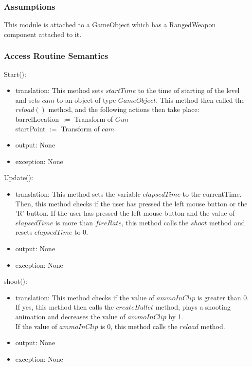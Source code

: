 \documentclass[12pt]{article}
\begin{document}
\subsubsection* {Assumptions}

This module is attached to a GameObject which has a RangedWeapon component attached to it.

\subsubsection* {Access Routine Semantics}

\noindent Start():
\begin{itemize}
	\item translation: This method sets $startTime$ to the time of starting of the level and sets $cam$ to an object of type $GameObject$. This method then called the $reload()$ method, and the following actions then take place:\\
	barrelLocation $:=$ Transform of $Gun$\\
	startPoint $:=$ Transform of $cam$ 
	\item output: None
	\item exception: None
\end{itemize}

\noindent Update():
\begin{itemize}
	\item translation: This method sets the variable $elapsedTime$ to the currentTime.
	Then, this method checks if the user has pressed the left mouse button or the 'R' button. If the user has pressed the left mouse button and the value of $elapsedTime$ is more than $fireRate$, this method calls the $shoot$ method and resets $elapsedTime$ to 0.
	\item output: None
	\item exception: None
\end{itemize}

\noindent shoot():
\begin{itemize}
	\item translation: This method checks if the value of $ammoInClip$ is greater than 0. If yes, this method then calls the $createBullet$ method, plays a shooting animation and decreases the value of $ammoInClip$ by 1.\\ 
	If the value of $ammoInClip$ is 0, this method calls the $reload$ method.
	\item output: None
	\item exception: None
\end{itemize}
\end{document}
